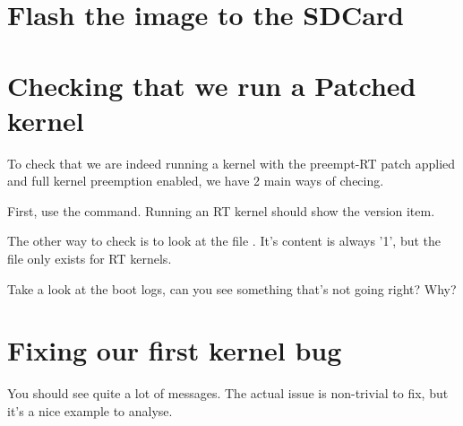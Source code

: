 \section{Flash the image to the SDCard}

\section{Checking that we run a Patched kernel}

To check that we are indeed running a kernel with the preempt-RT patch applied and
full kernel preemption enabled, we have 2 main ways of checing.

First, use the  command. Running an RT kernel should show the  version item.

The other way to check is to look at the file . It's content is always '1', but the file only exists for RT kernels.

Take a look at the boot logs, can you see something that's not going right? Why?

\section{Fixing our first kernel bug}

You should see quite a lot of  messages. The
actual issue is non-trivial to fix, but it's a nice example to analyse.

